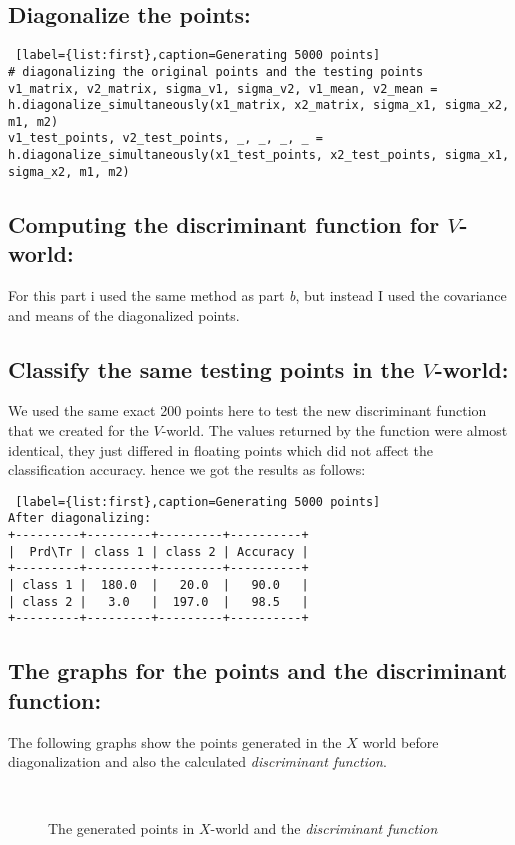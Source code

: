 \documentclass[11pt, oneside]{article}   	%
\begin{document}
\subsection{Diagonalize the points:}
\begin{lstlisting} [label={list:first},caption=Generating 5000 points]
# diagonalizing the original points and the testing points
v1_matrix, v2_matrix, sigma_v1, sigma_v2, v1_mean, v2_mean = h.diagonalize_simultaneously(x1_matrix, x2_matrix, sigma_x1, sigma_x2, m1, m2)
v1_test_points, v2_test_points, _, _, _, _ = h.diagonalize_simultaneously(x1_test_points, x2_test_points, sigma_x1, sigma_x2, m1, m2)
\end{lstlisting}

\subsection{Computing the discriminant function for $V$-world:}
For this part i used the same method as part \textit{b}, but instead I used the covariance and means of the diagonalized points.

\subsection{Classify the same testing points in the $V$-world:}
We used the same exact 200 points here to test the new discriminant function that we created for the $V$-world. The values returned by the function were almost identical, they just differed in floating points which did not affect the classification accuracy. hence we got the results as follows:
\begin{lstlisting} [label={list:first},caption=Generating 5000 points]
After diagonalizing:
+---------+---------+---------+----------+
|  Prd\Tr | class 1 | class 2 | Accuracy |
+---------+---------+---------+----------+
| class 1 |  180.0  |   20.0  |   90.0   |
| class 2 |   3.0   |  197.0  |   98.5   |
+---------+---------+---------+----------+

\end{lstlisting}


\subsection{The graphs for the points and the discriminant function:}
The following graphs show the points generated in the $X$ world before diagonalization and also the calculated \textit{discriminant function}.
\newpage
\begin{figure}
\begin{center}
	\subfigure[x1-x2]{
	\texttt{[image: x1-x2]}
	\label{absorbing}
	}
	\\
	\subfigure[x1-x3]{
	\texttt{[image: x1-x3]}
	\label{absorbing}
	}
\end{center}
\caption{The generated points in $X$-world and the \textit{discriminant function}}
\end{figure}
\end{document}
